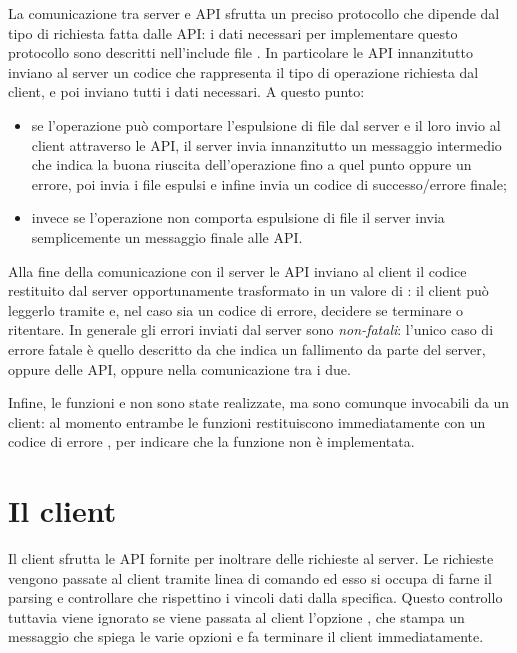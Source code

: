 \documentclass[11pt,oneface]{article}
\begin{document}
La comunicazione tra server e API sfrutta un preciso protocollo che dipende dal tipo di richiesta fatta dalle API: i dati necessari per implementare questo protocollo sono descritti nell'include file . In particolare le API innanzitutto inviano al server un codice che rappresenta il tipo di operazione richiesta dal client, e poi inviano tutti i dati necessari. A questo punto:
\begin{itemize}
    \item se l'operazione può comportare l'espulsione di file dal server e il loro invio al client attraverso le API, il server invia innanzitutto un messaggio intermedio che indica la buona riuscita dell'operazione fino a quel punto oppure un errore, poi invia i file espulsi e infine invia un codice di successo/errore finale;
    \item invece se l'operazione non comporta espulsione di file il server invia semplicemente un messaggio finale alle API.
\end{itemize}

Alla fine della comunicazione con il server le API inviano al client il codice restituito dal server opportunamente trasformato in un valore di : il client può leggerlo tramite  e, nel caso sia un codice di errore, decidere se terminare o ritentare. In generale gli errori inviati dal server sono \emph{non-fatali}: l'unico caso di errore fatale è quello descritto da  che indica un fallimento da parte del server, oppure delle API, oppure nella comunicazione tra i due.

Infine, le funzioni  e  non sono state realizzate, ma sono comunque invocabili da un client: al momento entrambe le funzioni restituiscono immediatamente  con un codice di errore , per indicare che la funzione non è implementata.

\section{Il client}

Il client sfrutta le API fornite per inoltrare delle richieste al server. 
Le richieste vengono passate al client tramite linea di comando ed esso si occupa di farne il parsing e controllare che rispettino i vincoli dati dalla specifica. 
Questo controllo tuttavia viene ignorato se viene passata al client l'opzione , che stampa un messaggio che spiega le varie opzioni e fa terminare il client immediatamente.
\end{document}
